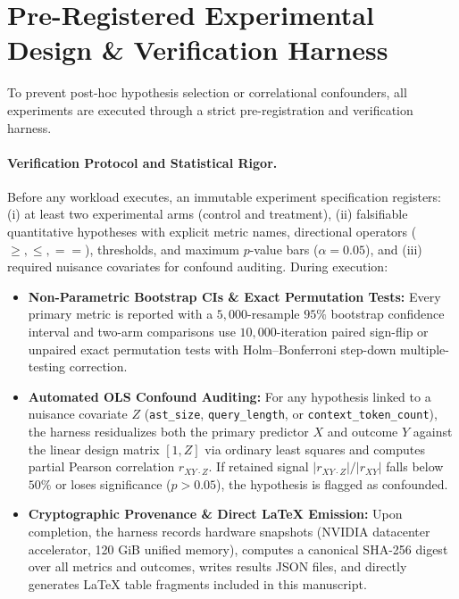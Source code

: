 \documentclass[10pt,twocolumn]{article}
\begin{document}
\section{Pre-Registered Experimental Design \& Verification Harness}
\label{sec:experimental_design}

To prevent post-hoc hypothesis selection or correlational confounders, all experiments are executed through a strict pre-registration and verification harness.

\paragraph{Verification Protocol and Statistical Rigor.}
Before any workload executes, an immutable experiment specification registers: (i) at least two experimental arms (control and treatment), (ii) falsifiable quantitative hypotheses with explicit metric names, directional operators ($\ge, \le, ==$), thresholds, and maximum $p$-value bars ($\alpha = 0.05$), and (iii) required nuisance covariates for confound auditing. During execution:
\begin{itemize}
    \item \textbf{Non-Parametric Bootstrap CIs \& Exact Permutation Tests:} Every primary metric is reported with a $5{,}000$-resample $95\%$ bootstrap confidence interval and two-arm comparisons use $10{,}000$-iteration paired sign-flip or unpaired exact permutation tests with Holm--Bonferroni step-down multiple-testing correction.
    \item \textbf{Automated OLS Confound Auditing:} For any hypothesis linked to a nuisance covariate $Z$ (\texttt{ast\_size}, \texttt{query\_length}, or \texttt{context\_token\_count}), the harness residualizes both the primary predictor $X$ and outcome $Y$ against the linear design matrix $[1, Z]$ via ordinary least squares and computes partial Pearson correlation $r_{XY \cdot Z}$. If retained signal $|r_{XY \cdot Z}| / |r_{XY}|$ falls below $50\%$ or loses significance ($p > 0.05$), the hypothesis is flagged as confounded.
    \item \textbf{Cryptographic Provenance \& Direct LaTeX Emission:} Upon completion, the harness records hardware snapshots (NVIDIA datacenter accelerator, 120 GiB unified memory), computes a canonical SHA-256 digest over all metrics and outcomes, writes results JSON files, and directly generates LaTeX table fragments included in this manuscript.
\end{itemize}
\end{document}
